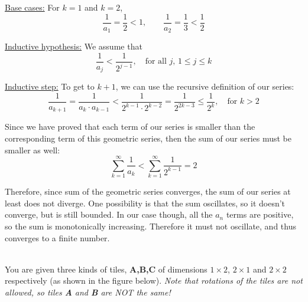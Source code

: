 \documentclass[11pt]{article}
\newif\ifsolutions
\begin{document}
\begin{qunlist}
{\underline{Base cases:} For $k=1$ and $k=2$, 
\[ 
\frac{1}{a_1} = \frac{1}{2} < 1, \qquad 
\frac{1}{a_2} = \frac{1}{3} < \frac{1}{2} 
\]

\underline{Inductive hypothesis:} We assume that 
\[ \frac{1}{a_j} < \frac{1}{2^{j-1}}, \quad \text{for all $j$, } 1 \leq j \leq k \]

\underline{Inductive step:} To get to $k+1$, we can use the recursive definition of our series:
\[ 
\frac{1}{a_{k+1}} = \frac{1}{a_k \cdot a_{k-1}} 
< \frac{1}{2^{k-1} \cdot 2^{k-2}} = \frac{1}{2^{2k-3}} 
\leq \frac{1}{2^k}, \quad \text{for } k > 2 
\]

Since we have proved that each term of our series is smaller than 
the corresponding term of this geometric series, then the sum of our series must be smaller as well:
\[ \sum_{k=1}^{\infty} \frac{1}{a_k} < \sum_{k=1}^{\infty} \frac{1}{2^{k-1}} = 2 \]

Therefore, since sum of the geometric series converges, the sum of our series at least does not diverge. One possibility is that the sum oscillates, so it doesn't converge, but is still bounded. In our case though, all the $a_n$ terms are positive, so the sum is monotonically increasing. Therefore it must not oscillate, and thus converges to a finite number.
}
\fi


%
%
%


\pagebreak

 \\
You are given three kinds of tiles, \textbf{A,B,C} of dimensions $1 \times 2$, $2 \times 1$
and $2 \times 2$ respectively (as shown in the figure below).
\textit{Note that rotations of the tiles are not allowed, so tiles \textbf{A} and \textbf{B} are NOT the same!}


\end{qunlist}
\end{document}
